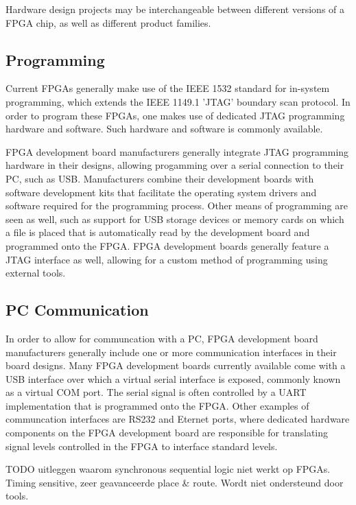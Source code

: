 \documentclass[openright]{template/uva-bachelor-thesis}
\begin{document}
Hardware design projects may be interchangeable between different versions of a FPGA chip, as well as different product families.

\subsection{Programming}
Current FPGAs generally make use of the IEEE 1532 standard for in-system programming, which extends the IEEE 1149.1 'JTAG' boundary scan protocol. In order to program these FPGAs, one makes use of dedicated JTAG programming hardware and software. Such hardware and software is commonly available.  

FPGA development board manufacturers generally integrate JTAG programming hardware in their designs, allowing progamming over a serial connection to their PC, such as USB. Manufacturers combine their development boards with software development kits that facilitate the operating system drivers and software required for the programming process. Other means of programming are seen as well, such as support for USB storage devices or memory cards on which a file is placed that is automatically read by the development board and programmed onto the FPGA. FPGA development boards generally feature a JTAG interface as well, allowing for a custom method of programming using external tools. 

\subsection{PC Communication}
In order to allow for communcation with a PC, FPGA development board manufacturers generally include one or more communication interfaces in their board designs. Many FPGA development boards currently available come with a USB interface over which a virtual serial interface is exposed, commonly known as a virtual COM port. The serial signal is often controlled by a UART implementation that is programmed onto the FPGA. Other examples of communcation interfaces are RS232 and Eternet ports, where dedicated hardware components on the FPGA development board are responsible for translating signal levels controlled in the FPGA to interface standard levels. 

TODO uitleggen waarom synchronous sequential logic niet werkt op FPGAs. Timing sensitive, zeer geavanceerde place \& route. Wordt niet ondersteund door tools. 

\end{document}
